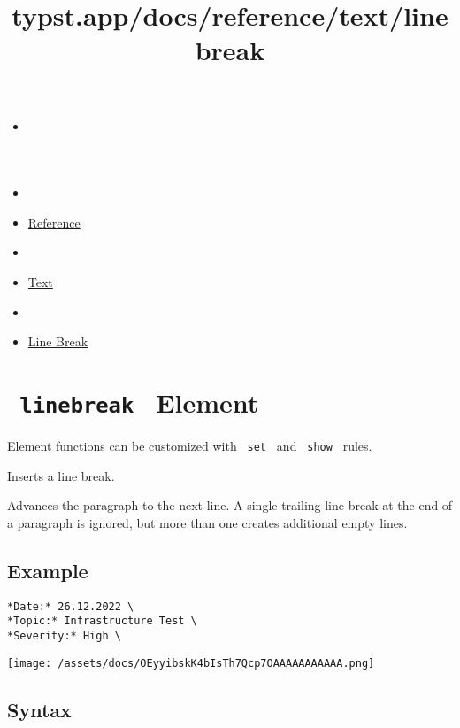 \title{typst.app/docs/reference/text/linebreak}

\begin{itemize}
\tightlist
\item
  \href{/docs}{}
\item
  
\item
  \href{/docs/reference/}{Reference}
\item
  
\item
  \href{/docs/reference/text/}{Text}
\item
  
\item
  \href{/docs/reference/text/linebreak/}{Line Break}
\end{itemize}

\section{\texorpdfstring{\texttt{\ linebreak\ } {{ Element
}}}{ linebreak   Element }}\label{summary}

\label{element-tooltip}
Element functions can be customized with \texttt{\ set\ } and
\texttt{\ show\ } rules.

Inserts a line break.

Advances the paragraph to the next line. A single trailing line break at
the end of a paragraph is ignored, but more than one creates additional
empty lines.

\subsection{Example}\label{example}

\begin{verbatim}
*Date:* 26.12.2022 \
*Topic:* Infrastructure Test \
*Severity:* High \
\end{verbatim}

\texttt{[image: /assets/docs/OEyyibskK4bIsTh7Qcp7OAAAAAAAAAAA.png]}

\subsection{Syntax}\label{syntax}

